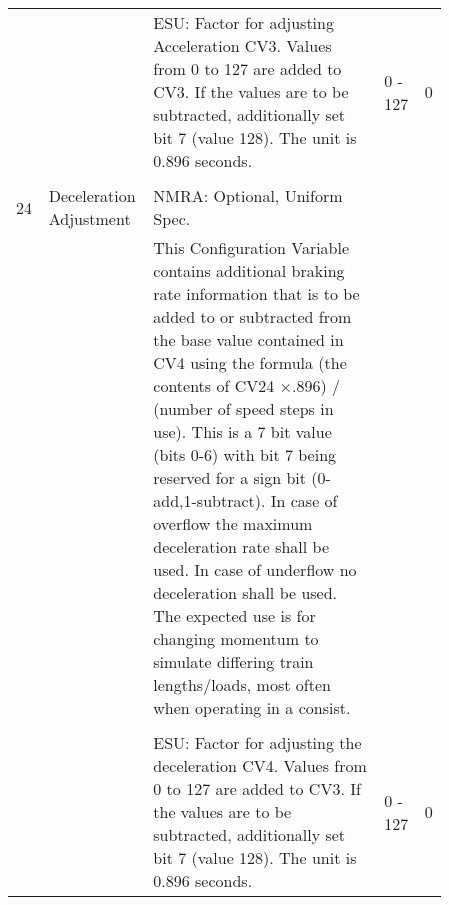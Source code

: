 \begin{tabular}{p{0.075\linewidth} p{0.15\linewidth} p{0.525\linewidth} p{0.06\linewidth} p{0.05\linewidth}}
\\
& & ESU: Factor for adjusting Acceleration CV3. Values from 0 to 127 are added to CV3. If the values are to be subtracted, additionally set bit 7 (value 128). The unit is 0.896 seconds. & 0 - 127 & 0\\
\\
24 & Deceleration Adjustment & NMRA: Optional, Uniform Spec.\\
& & This Configuration Variable contains additional braking rate information that is to be added to or subtracted from the base value contained in CV4 using the formula (the contents of CV24 $\times$.896) / (number of speed steps in use). This is a 7 bit value (bits 0-6) with bit 7 being reserved for a sign bit (0-add,1-subtract). In case of overflow the maximum deceleration rate shall be used. In case of underflow no deceleration shall be used. The expected use is for changing momentum to simulate differing train lengths/loads, most often when operating in a consist.\\
\\
& & ESU: Factor for adjusting the deceleration CV4. Values from 0 to 127 are added to CV3. If the values are to be subtracted, additionally set bit 7 (value 128). The unit is 0.896 seconds. & 0 - 127 & 0\\
\end{tabular}
\newpage
